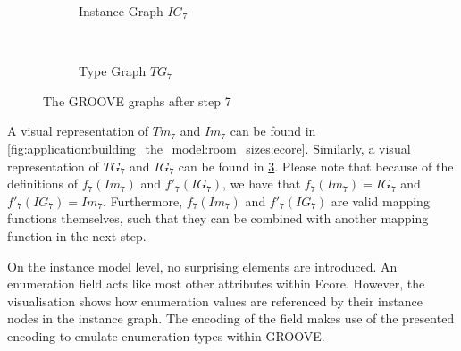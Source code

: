 \begin{figure}[p]
    \centering
    \begin{subfigure}{0.98\textwidth}
        \centering
        
        \caption{Instance Graph $IG_7$}
        \label{fig:application:building_the_model:room_sizes:groove:instance_graph}
    \end{subfigure}
    \\
    \begin{subfigure}{0.98\textwidth}
        \centering
        
        \caption{Type Graph $TG_7$}
        \label{fig:application:building_the_model:room_sizes:groove:type_graph}
    \end{subfigure}
    \caption{The GROOVE graphs after step 7}
    \label{fig:application:building_the_model:room_sizes:groove}
\end{figure}

A visual representation of $Tm_7$ and $Im_7$ can be found in \cref{fig:application:building_the_model:room_sizes:ecore}. Similarly, a visual representation of $TG_7$ and $IG_7$ can be found in \cref{fig:application:building_the_model:room_sizes:groove}. Please note that because of the definitions of $f_7(Im_7)$ and $f'_7(IG_7)$, we have that $f_7(Im_7) = IG_7$ and $f'_7(IG_7) = Im_7$. Furthermore, $f_7(Im_7)$ and $f'_7(IG_7)$ are valid mapping functions themselves, such that they can be combined with another mapping function in the next step.

On the instance model level, no surprising elements are introduced. An enumeration field acts like most other attributes within Ecore. However, the visualisation shows how enumeration values are referenced by their instance nodes in the instance graph. The encoding of the field makes use of the presented encoding to emulate enumeration types within GROOVE.

\afterpage{\FloatBarrier}